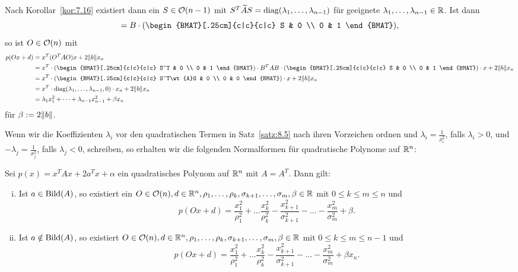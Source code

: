 \begin{beweis}
\begin{enumerate}[(i)]
		Nach Korollar~\ref{kor:7.16} existiert dann ein $S \in \mathcal{O}(n-1)$ mit $S^T\widetilde{A}S = \operatorname{diag}(\lambda_1,\dots,\lambda_{n-1})$ für geeignete $\lambda_1,\dots,\lambda_{n-1} \in \mathbb{R}$.
		Ist dann
		\[
		= B \cdot \enb{\begin{BMAT}[.25cm]{c|c}{c|c}
			S & 0 \\
			0 & 1
			\end{BMAT}},
		\]
		so ist $O \in \mathcal{O}(n)$ mit
		\begin{align*}
			p(Ox+d) &= x^T(O^TAO)x + 2 \no{b} x_n \\
			&= x^T \cdot \enb{\begin{BMAT}[.25cm]{c|c}{c|c}
				S^T & 0 \\
				0 & 1
				\end{BMAT}} \cdot B^TAB \cdot \enb{\begin{BMAT}[.25cm]{c|c}{c|c}
				S & 0 \\
				0 & 1
				\end{BMAT}} \cdot x + 2 \no{b} x_n \\
			&= x^T \cdot \enb{\begin{BMAT}[.25cm]{c|c}{c|c}
				S^T\wt{A}S & 0 \\
				0 & 0
				\end{BMAT}} \cdot x + 2 \no{b} x_n \\
			&= x^T \cdot \diag(\lambda_1,\dots,\lambda_{n-1},0) \cdot x_n + 2 \no{b} x_n \\
			&= \lambda_1 x_1^2 + \dots + \lambda_{n-1}x_{n-1}^2 + \beta x_n
		\end{align*}
		für $\beta := 2 \no{b}$. 
	\end{enumerate}
\end{beweis}

Wenn wir die Koeffizienten $\lambda_i$ vor den quadratischen Termen in Satz~\ref{satz:8.5} nach ihren Vorzeichen ordnen und $\lambda_i = \frac{1}{\rho_i^2}$, falls $\lambda_i > 0$, und $-\lambda_j = \frac{1}{\sigma_j^2}$, falls $\lambda_j < 0$, schreiben, so erhalten wir die folgenden Normalformen für quadratische Polynome auf $\mathbb{R}^n$:

\begin{satz}
	\label{satz:8.6}
	Sei $p(x) = x^TAx + 2a^Tx + \alpha$ ein quadratisches Polynom auf $\mathbb{R}^n$ mit $A = A^T$.
	Dann gilt:
	\begin{enumerate}[(i)]
		\item Ist $a \in \operatorname{Bild}(A)$, so existiert ein $O \in \mathcal{O}(n), d \in \mathbb{R}^n, \rho_1, \dots, \rho_k, \sigma_{k+1},\dots,\sigma_{m}, \beta \in \mathbb{R}$ mit $0 \leq k \leq m \leq n$ und
		\[
			p(Ox+d) = \frac{x_1^2}{\rho_1^2} + \dots \frac{x_k^2}{\rho_k^2} - \frac{x_{k+1}^2}{\sigma_{k+1}^2} - \dots - \frac{x_m^2}{\sigma_m^2} + \beta.
		\]
		\item Ist $a \notin \operatorname{Bild}(A)$, so existiert $O \in \mathcal{O}(n), d \in \mathbb{R}^n, \rho_1, \dots, \rho_k, \sigma_{k+1},\dots,\sigma_m,\beta \in \mathbb{R}$ mit $0 \leq k \leq m \leq n-1$ und
		\[
		p(Ox+d) = \frac{x_1^2}{\rho_1^2} + \dots \frac{x_k^2}{\rho_k^2} - \frac{x_{k+1}^2}{\sigma_{k+1}^2} - \dots - \frac{x_m^2}{\sigma_m^2} + \beta x_n.
		\]
	\end{enumerate}
\end{satz}

